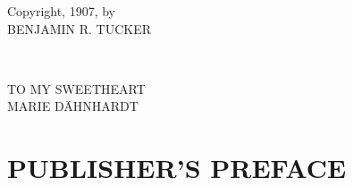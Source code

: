 \documentclass[12pt,a4paper]{book}
\begin{document}
\begin{center}
Copyright, 1907, by\\
BENJAMIN R. TUCKER
\end{center}

\newpage{}

~

\vspace{200pt}

\begin{center}
TO MY SWEETHEART\\
MARIE D\"AHNHARDT
\end{center}

\medskip{}

\setcounter{secnumdepth}{-1}
\chapter[Publisher's Preface]{\centering PUBLISHER'S PREFACE}
\end{document}
